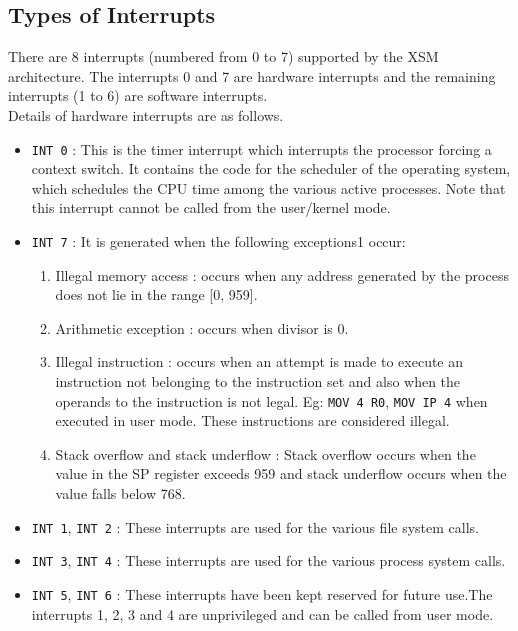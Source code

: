 \documentclass[11pt]{article}
\begin{document}
\subsection{Types of Interrupts}
There are 8 interrupts (numbered from 0 to 7) supported by the XSM architecture. The interrupts 0 and 7 are hardware interrupts and the remaining interrupts (1 to 6) are software interrupts.\\
Details of hardware interrupts are as follows.
\begin{itemize}
\item \texttt{INT 0} : This is the timer interrupt which interrupts the processor forcing a context switch. It contains the code for the scheduler of the operating system, which schedules the CPU time among the various active processes. Note that this interrupt cannot be called from the user/kernel mode.
\item \texttt{INT 7} : It is generated when the following exceptions1 occur:
\begin{enumerate}


\item Illegal memory access : occurs when any address generated by the process does not lie in the range [0, 959].
\item Arithmetic exception : occurs when divisor is 0.
\item Illegal instruction : occurs when an attempt is made to execute an instruction not belonging to the instruction set and also when the operands to the instruction is not legal. Eg: \texttt{MOV 4 R0}, \texttt{MOV IP 4} when executed in user mode. These instructions are considered illegal.
\item Stack overflow and stack underflow : Stack overflow occurs when the value in the SP register exceeds 959 and stack underflow occurs when the value falls below 768.
\end{enumerate}
\item \texttt{INT 1}, \texttt{INT 2} : These interrupts are used for the various file system calls. 
\item \texttt{INT 3}, \texttt{INT 4} : These interrupts are used for the various process system calls. 
\item \texttt{INT 5}, \texttt{INT 6} : These interrupts have been kept reserved for future use.The interrupts 1, 2, 3 and 4 are unprivileged and can be called from user mode.
\end{itemize}
\end{document}
